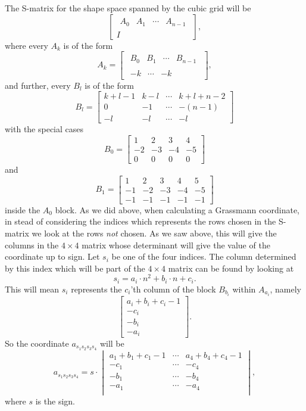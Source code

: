 \documentclass[a4paper,12pt]{book}
\theoremstyle{plain}
\theoremstyle{definition}
\begin{document}
The S-matrix for the shape space spanned by the cubic grid will be
\[
	\begin{bmatrix}
		\begin{matrix}
			A_0 & A_1 & \cdots & A_{n-1}
		\end{matrix} \\
		I
	\end{bmatrix},
\]
where every \( A_k \) is of the form
\[
	A_k = \begin{bmatrix}
		\begin{matrix}
			B_0 & B_1 & \cdots & B_{n - 1}
		\end{matrix} \\
		\begin{matrix}
			-k & \cdots & -k
		\end{matrix}
	\end{bmatrix},
\]
and further, every \( B_l \) is of the form
\[
	B_l = \begin{bmatrix}
		k + l - 1 & k - l & \cdots & k + l + n - 2 \\
		0 & -1 & \cdots & -(n-1) \\
		-l & -l & \cdots & -l
	\end{bmatrix}
\]
with the special cases
\[
	B_0 = \begin{bmatrix}
		1 & 2 & 3 & 4 \\
		-2 & -3 & -4 & -5 \\
		0 & 0 & 0 & 0
	\end{bmatrix}
\]
and
\[
	B_1 = \begin{bmatrix}
		1 & 2 & 3 & 4 & 5\\
		-1 & -2 & -3 & -4 & -5 \\
		-1 & -1 & -1 & -1 & -1
	\end{bmatrix}
\]
inside the \( A_0 \) block.
As we did above, when calculating a Grassmann coordinate, in stead of considering the indices which
represents the rows chosen in the S-matrix we look at the rows \emph{not} chosen. As we saw above,
this will give the columns in the \( 4 \times 4 \) matrix whose determinant will give the value
of the coordinate up to sign. Let \( s_i \) be one of the four indices. The column determined by
this index which will be part of the \( 4 \times 4 \) matrix can be found by looking at
\[
	s_i = a_i \cdot n^2 + b_i \cdot n + c_i.
\]
This will mean \( s_i \) represents the \( c_i \)'th column of the block \( B_{b_i} \) within
\( A_{a_i} \), namely
\[
	\begin{bmatrix}
		a_i + b_i + c_i - 1 \\ -c_i \\ -b_i \\ -a_i
	\end{bmatrix}.
\]
So the coordinate \( a_{s_1 s_2 s_3 s_4} \) will be
\[
	a_{s_1 s_2 s_3 s_4} = s \cdot \begin{vmatrix}
		a_1 + b_1 + c_1 - 1 & \cdots & a_4 + b_4 + c_4 - 1 \\
		-c_1 & \cdots & -c_4 \\
		-b_1 & \cdots & -b_4 \\
		-a_1 & \cdots & -a_4 \\
	\end{vmatrix},
\]
where \( s \) is the sign.
\end{document}
